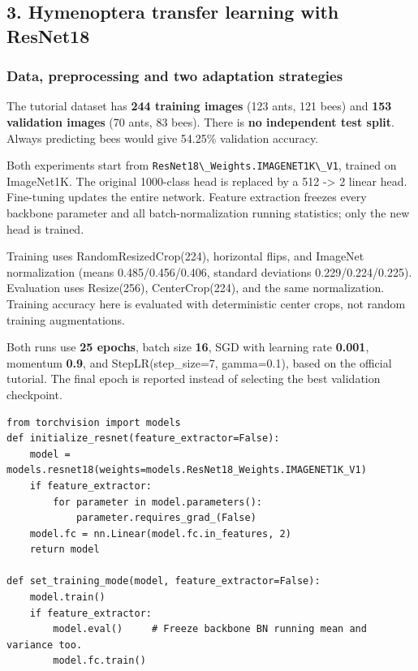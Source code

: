 \documentclass[10pt,a4paper]{article}
\newcommand{\passthrough}[1]{#1}
\begin{document}
\subsection{3. Hymenoptera transfer learning with ResNet18}\label{hymenoptera-transfer-learning-with-resnet18}

\subsubsection{Data, preprocessing and two adaptation strategies}\label{data-preprocessing-and-two-adaptation-strategies}

The tutorial dataset has \textbf{244 training images} (123 ants, 121 bees) and \textbf{153 validation images} (70 ants, 83 bees). There is \textbf{no independent test split}. Always predicting bees would give 54.25\% validation accuracy.

Both experiments start from \passthrough{\lstinline!ResNet18\_Weights.IMAGENET1K\_V1!}, trained on ImageNet1K. The original 1000-class head is replaced by a 512 -\textgreater{} 2 linear head. Fine-tuning updates the entire network. Feature extraction freezes every backbone parameter and all batch-normalization running statistics; only the new head is trained.

Training uses RandomResizedCrop(224), horizontal flips, and ImageNet normalization (means 0.485/0.456/0.406, standard deviations 0.229/0.224/0.225). Evaluation uses Resize(256), CenterCrop(224), and the same normalization. Training accuracy here is evaluated with deterministic center crops, not random training augmentations.

Both runs use \textbf{25 epochs}, batch size \textbf{16}, SGD with learning rate \textbf{0.001}, momentum \textbf{0.9}, and StepLR(step\_size=7, gamma=0.1), based on the official tutorial. The final epoch is reported instead of selecting the best validation checkpoint.

\par\noindent\begin{minipage}{\linewidth}
\begin{lstlisting}
from torchvision import models
def initialize_resnet(feature_extractor=False):
    model = models.resnet18(weights=models.ResNet18_Weights.IMAGENET1K_V1)
    if feature_extractor:
        for parameter in model.parameters():
            parameter.requires_grad_(False)
    model.fc = nn.Linear(model.fc.in_features, 2)
    return model

def set_training_mode(model, feature_extractor=False):
    model.train()
    if feature_extractor:
        model.eval()     # Freeze backbone BN running mean and variance too.
        model.fc.train()
\end{lstlisting}
\end{minipage}\par
\end{document}
